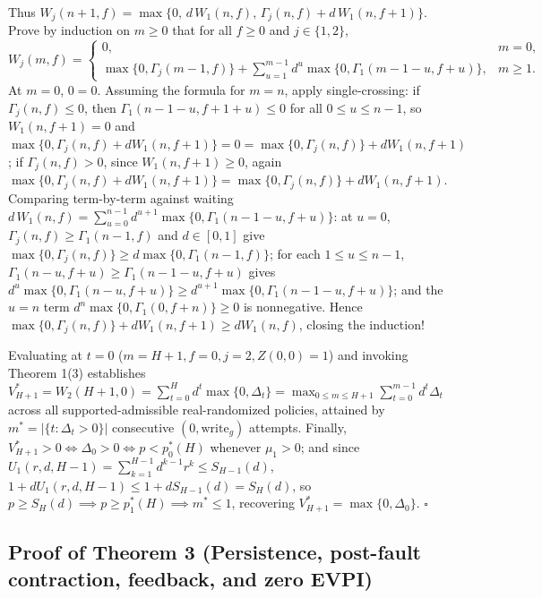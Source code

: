 \documentclass[11pt,letterpaper]{article}
\begin{document}
Thus
\(W_j(n+1, f) = \max\{0,\, d\,W_1(n, f),\, \Gamma_j(n, f) + d\,W_1(n, f+1)\}\).
Prove by induction on \(m \ge 0\) that for all \(f \ge 0\) and
\(j \in \{1,2\}\),
\[W_j(m, f) = \begin{cases} 0, & m = 0, \\ \max\{0, \Gamma_j(m-1, f)\} + \sum_{u=1}^{m-1} d^u \max\{0, \Gamma_1(m - 1 - u, f + u)\}, & m \ge 1. \end{cases}\]
At \(m = 0\), \(0 = 0\). Assuming the formula for \(m = n\), apply
single-crossing: if \(\Gamma_j(n, f) \le 0\), then
\(\Gamma_1(n - 1 - u, f + 1 + u) \le 0\) for all \(0 \le u \le n - 1\),
so \(W_1(n, f+1) = 0\) and
\(\max\{0, \Gamma_j(n, f) + d W_1(n, f+1)\} = 0 = \max\{0, \Gamma_j(n, f)\} + d W_1(n, f+1)\);
if \(\Gamma_j(n, f) > 0\), since \(W_1(n, f+1) \ge 0\), again
\(\max\{0, \Gamma_j(n, f) + d W_1(n, f+1)\} = \max\{0, \Gamma_j(n, f)\} + d W_1(n, f+1)\).
Comparing term-by-term against waiting
\(d\,W_1(n, f) = \sum_{u=0}^{n-1} d^{u+1}\max\{0, \Gamma_1(n - 1 - u, f + u)\}\):
at \(u = 0\), \(\Gamma_j(n, f) \ge \Gamma_1(n-1, f)\) and
\(d \in [0,1]\) give
\(\max\{0, \Gamma_j(n, f)\} \ge d\max\{0, \Gamma_1(n-1, f)\}\); for each
\(1 \le u \le n-1\),
\(\Gamma_1(n - u, f + u) \ge \Gamma_1(n - 1 - u, f + u)\) gives
\(d^u\max\{0, \Gamma_1(n - u, f + u)\} \ge d^{u+1}\max\{0, \Gamma_1(n - 1 - u, f + u)\}\);
and the \(u = n\) term \(d^n\max\{0, \Gamma_1(0, f+n)\} \ge 0\) is
nonnegative. Hence
\(\max\{0, \Gamma_j(n,f)\} + d W_1(n, f+1) \ge d W_1(n, f)\), closing
the induction!

Evaluating at \(t = 0\) (\(m = H + 1, f = 0, j = 2, Z(0,0) = 1\)) and
invoking Theorem 1(3) establishes
\(V_{H+1}^* = W_2(H+1, 0) = \sum_{t=0}^H d^t \max\{0, \Delta_t\} = \max_{0 \le m \le H+1} \sum_{t=0}^{m-1} d^t \Delta_t\)
across all supported-admissible real-randomized policies, attained by
\(m^* = |\{t : \Delta_t > 0\}|\) consecutive \((0, \mathrm{write}_g)\)
attempts. Finally, \(V_{H+1}^* > 0 \iff \Delta_0 > 0 \iff p < p_0^*(H)\)
whenever \(\mu_1 > 0\); and since
\(U_1(r, d, H-1) = \sum_{k=1}^{H-1} d^{k-1} r^k \le S_{H-1}(d)\),
\(1 + d U_1(r, d, H-1) \le 1 + d S_{H-1}(d) = S_H(d)\), so
\(p \ge S_H(d) \implies p \ge p_1^*(H) \implies m^* \le 1\), recovering
\(V_{H+1}^* = \max\{0, \Delta_0\}\). \(\square\)

\subsection{Proof of Theorem 3 (Persistence, post-fault contraction,
feedback, and zero
EVPI)}\label{proof-of-theorem-3-persistence-post-fault-contraction-feedback-and-zero-evpi}
\end{document}
